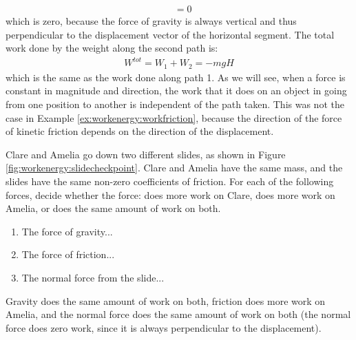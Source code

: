 \begin{example}
\begin{align*}
&=0
\end{align*}
which is zero, because the force of gravity is always vertical and thus perpendicular to the displacement vector of the horizontal segment. The total work done by the weight along the second path is:
\begin{align*}
W^{tot} = W_1 + W_2 = -mgH
\end{align*}
which is the same as the work done along path 1. As we will see, when a force is constant in magnitude and direction, the work that it does on an object in going from one position to another is independent of the path taken. This was not the case in Example \ref{ex:workenergy:workfriction}, because the direction of the force of kinetic friction depends on the direction of the displacement. 
\end{example} 

\begin{checkpoint}
Clare and Amelia go down two different slides, as shown in Figure \ref{fig:workenergy:slidecheckpoint}. Clare and Amelia have the same mass, and the slides have the same non-zero coefficients of friction. 
For each of the following forces, decide whether the force: does more work on Clare, does more work on Amelia, or does the same amount of work on both.
\begin{enumerate}
\item The force of gravity... 
\item The force of friction... 
\item The normal force from the slide... 
\end{enumerate}
\begin{answer}
Gravity does the same amount of work on both, friction does more work on Amelia, and the normal force does the same amount of work on both (the normal force does zero work, since it is always perpendicular to the displacement). 
\end{answer}
\end{checkpoint}


